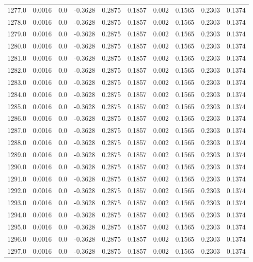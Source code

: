 \begin{longtable}{lrrrrrrrrr}
1277.0 & 0.0016 & 0.0 & -0.3628 & 0.2875 & 0.1857 & 0.002 & 0.1565 & 0.2303 & 0.1374 \\
1278.0 & 0.0016 & 0.0 & -0.3628 & 0.2875 & 0.1857 & 0.002 & 0.1565 & 0.2303 & 0.1374 \\
1279.0 & 0.0016 & 0.0 & -0.3628 & 0.2875 & 0.1857 & 0.002 & 0.1565 & 0.2303 & 0.1374 \\
1280.0 & 0.0016 & 0.0 & -0.3628 & 0.2875 & 0.1857 & 0.002 & 0.1565 & 0.2303 & 0.1374 \\
1281.0 & 0.0016 & 0.0 & -0.3628 & 0.2875 & 0.1857 & 0.002 & 0.1565 & 0.2303 & 0.1374 \\
1282.0 & 0.0016 & 0.0 & -0.3628 & 0.2875 & 0.1857 & 0.002 & 0.1565 & 0.2303 & 0.1374 \\
1283.0 & 0.0016 & 0.0 & -0.3628 & 0.2875 & 0.1857 & 0.002 & 0.1565 & 0.2303 & 0.1374 \\
1284.0 & 0.0016 & 0.0 & -0.3628 & 0.2875 & 0.1857 & 0.002 & 0.1565 & 0.2303 & 0.1374 \\
1285.0 & 0.0016 & 0.0 & -0.3628 & 0.2875 & 0.1857 & 0.002 & 0.1565 & 0.2303 & 0.1374 \\
1286.0 & 0.0016 & 0.0 & -0.3628 & 0.2875 & 0.1857 & 0.002 & 0.1565 & 0.2303 & 0.1374 \\
1287.0 & 0.0016 & 0.0 & -0.3628 & 0.2875 & 0.1857 & 0.002 & 0.1565 & 0.2303 & 0.1374 \\
1288.0 & 0.0016 & 0.0 & -0.3628 & 0.2875 & 0.1857 & 0.002 & 0.1565 & 0.2303 & 0.1374 \\
1289.0 & 0.0016 & 0.0 & -0.3628 & 0.2875 & 0.1857 & 0.002 & 0.1565 & 0.2303 & 0.1374 \\
1290.0 & 0.0016 & 0.0 & -0.3628 & 0.2875 & 0.1857 & 0.002 & 0.1565 & 0.2303 & 0.1374 \\
1291.0 & 0.0016 & 0.0 & -0.3628 & 0.2875 & 0.1857 & 0.002 & 0.1565 & 0.2303 & 0.1374 \\
1292.0 & 0.0016 & 0.0 & -0.3628 & 0.2875 & 0.1857 & 0.002 & 0.1565 & 0.2303 & 0.1374 \\
1293.0 & 0.0016 & 0.0 & -0.3628 & 0.2875 & 0.1857 & 0.002 & 0.1565 & 0.2303 & 0.1374 \\
1294.0 & 0.0016 & 0.0 & -0.3628 & 0.2875 & 0.1857 & 0.002 & 0.1565 & 0.2303 & 0.1374 \\
1295.0 & 0.0016 & 0.0 & -0.3628 & 0.2875 & 0.1857 & 0.002 & 0.1565 & 0.2303 & 0.1374 \\
1296.0 & 0.0016 & 0.0 & -0.3628 & 0.2875 & 0.1857 & 0.002 & 0.1565 & 0.2303 & 0.1374 \\
1297.0 & 0.0016 & 0.0 & -0.3628 & 0.2875 & 0.1857 & 0.002 & 0.1565 & 0.2303 & 0.1374 \\

\end{longtable}
